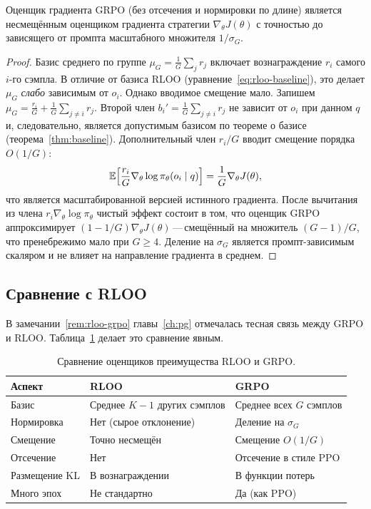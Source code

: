 \begin{theorem}
\label{thm:grpo-unbiased}
Оценщик градиента GRPO (без отсечения и нормировки по длине) является несмещённым оценщиком градиента стратегии $\nabla_\theta J(\theta)$ с точностью до зависящего от промпта масштабного множителя $1/\sigma_G$.
\end{theorem}

\begin{proof}
Базис среднего по группе $\mu_G = \frac{1}{G}\sum_j r_j$ включает вознаграждение $r_i$ самого $i$-го сэмпла. В отличие от базиса RLOO (уравнение~\eqref{eq:rloo-baseline}), это делает $\mu_G$ \emph{слабо} зависимым от $o_i$. Однако вводимое смещение мало. Запишем $\mu_G = \frac{r_i}{G} + \frac{1}{G}\sum_{j \neq i} r_j$. Второй член $b_i' = \frac{1}{G}\sum_{j \neq i} r_j$ не зависит от $o_i$ при данном $q$ и, следовательно, является допустимым базисом по теореме о базисе (теорема~\ref{thm:baseline}). Дополнительный член $r_i / G$ вводит смещение порядка $O(1/G)$:
\[
\operatorname{\mathbb{E}}\!\left[\frac{r_i}{G} \nabla_\theta \log \pi_\theta(o_i \mid q)\right] = \frac{1}{G}\nabla_\theta J(\theta),
\]
что является масштабированной версией истинного градиента. После вычитания из члена $r_i \nabla_\theta \log \pi_\theta$ чистый эффект состоит в том, что оценщик GRPO аппроксимирует $(1 - 1/G)\nabla_\theta J(\theta)$\,---\,смещённый на множитель $(G-1)/G$, что пренебрежимо мало при $G \geq 4$. Деление на $\sigma_G$ является промпт-зависимым скаляром и не влияет на направление градиента в среднем.
\end{proof}

\subsection{Сравнение с RLOO}

В замечании~\ref{rem:rloo-grpo} главы~\ref{ch:pg} отмечалась тесная связь между GRPO и RLOO. Таблица~\ref{tab:grpo-vs-rloo} делает это сравнение явным.

\begin{table}[ht]
\centering
\caption{Сравнение оценщиков преимущества RLOO и GRPO.}
\label{tab:grpo-vs-rloo}
\footnotesize
\begin{tabular}{@{}lll@{}}
\toprule
\textbf{Аспект} & \textbf{RLOO} & \textbf{GRPO} \\
\midrule
Базис & Среднее $K-1$ других сэмплов & Среднее всех $G$ сэмплов \\
Нормировка & Нет (сырое отклонение) & Деление на $\sigma_G$ \\
Смещение & Точно несмещён & Смещение $O(1/G)$ \\
Отсечение & Нет & Отсечение в стиле PPO \\
Размещение KL & В вознаграждении & В функции потерь \\
Много эпох & Не стандартно & Да (как PPO) \\
\bottomrule
\end{tabular}
\end{table}

